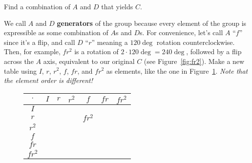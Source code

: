 \documentclass[../key.tex]{subfiles}
\begin{document}
\begin{outer_problem}
\item Find a combination of $A$ and $D$ that yields $C$.
\end{outer_problem}

\begin{outer_problem}
\item We call $A$ and $D$ \textbf{generators} of the group because every element of the group is expressible as some combination of $A$s and $D$s. For convenience, let's call $A$ ``$f$'' since it's a flip, and call $D$ ``$r$'' meaning a $120\deg$ rotation counterclockwise. Then, for example, $fr^2$ is a rotation of $2\cdot 120\deg = 240\deg$, followed by a flip across the $A$ axis, equivalent to our original $C$ (see Figure~\ref{fig:fr2}). Make a new table using $I$, $r$, $r^2$, $f$, $fr$, and $fr^2$ as elements, like the one in Figure~\ref{fig:alttable}. \textit{Note that the element order is different!}
\end{outer_problem}

\begin{figure}[h]
	\begin{center}
		\begin{minipage}[b]{\textwidth}
			\centering
			\begin{tabular}{c|cccccc}
				\hline
				$\cdot$ & $I$ & $r$ & $r^2$ & $f$ & $fr$ & $fr^2$ \\ \hline 
				\rowcolor{light-gray}
				$I$    &   &   &   &   &   &   \\ 
				$r$    &   &   &   & $fr^2$  &   &   \\  
				\rowcolor{light-gray}
				$r^2$    &   &   &   &   &   &   \\ 
				$f$    &   &   &   &   &   &   \\  
				\rowcolor{light-gray}
				$fr$    &   &   &   &   &   &   \\ 
				$fr^2$    &   &   &   &   &   &   \\ \hline
			\end{tabular}
			\vspace*{0.5\baselineskip}
		\end{minipage}
	\end{center}
	\vspace*{-2\baselineskip}
	\begin{center}
		\begin{minipage}[t]{\textwidth}
			\label{fig:alttable}
		\end{minipage}
	\end{center}
	\vspace*{-2\baselineskip}
\end{figure}
\end{document}
